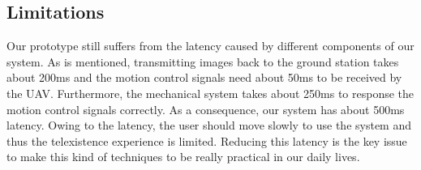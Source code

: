 \documentclass[journal]{IEEEtran}
\begin{document}






\subsection{Limitations}

Our prototype still suffers from the latency caused by different components
of our system. As is mentioned, transmitting images
back to the ground station takes about 200ms and the motion control
signals need about 50ms to be received by the UAV. Furthermore, the
mechanical system takes about 250ms to response the motion control
signals correctly. As a consequence, our system has about 500ms
latency. Owing to the latency, the user should move slowly to use the system
and thus the telexistence experience is limited. Reducing
this latency is the key issue to make this kind of techniques to be really
practical in our daily lives.
	
\end{document}
